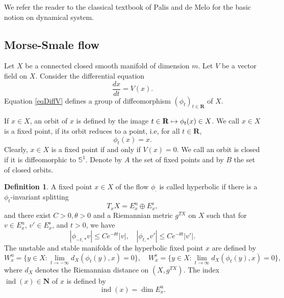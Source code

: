 \documentclass[JEP,XML,SOM,Unicode]{cedram}
\newcommand\mto{\mathchoice{\longmapsto}{\mapsto}{\mapsto}{\mapsto}}
\newcommand{\rs}{\mathrm{s}}
\newcommand{\ru}{\mathrm{u}}
\theoremstyle{plain}
\theoremstyle{definition}
\newtheorem{defin}[lem]{Definition}
\theoremstyle{remark}
\newcommand{\bN}{\mathbf{N}}
\newcommand{\bR}{\mathbf{R}}
\newcommand{\bbS}{\mathbb{S}}
\DeclareMathOperator{\ind}{ind}
\let\l\leqslant
\begin{document}
We refer the reader to the classical textbook of Palis and de
Melo \cite{Palis82} for the basic notion on dynamical system.

\subsection{Morse-Smale flow}\label{sMS}
Let $X$ be a connected closed smooth manifold of dimension $m$. Let $V$ be a
vector field on $X$. Consider the differential equation
\begin{equation}\label{eqDiffV}
\frac{dx}{dt}=V(x).
\end{equation}
Equation \eqref{eqDiffV} defines a group of diffeomorphism
$(\phi_{t})_{t\in \bR}$ of $X$.

If $x\in X$, an orbit of $x$ is defined by the image $t\in \bR\mto
\phi_{t}(x)\in X$. We call $x\in X$ is a fixed point, if its orbit reduces to a point, i.e, for all $t\in \bR$,
\begin{equation*}
\phi_{t}(x)=x.
\end{equation*}
Clearly, $x\in X$ is a fixed point if and only if $V(x)=0$.
We call an orbit is closed if it is diffeomorphic to $\bbS^{1}$.
Denote by $A$ the set of fixed points and by $B$ the set of closed orbits.

\begin{defin}
A fixed point $x\in X$ of the flow $\phi_{\cdot}$ is called
hyperbolic if there is a $\phi_{t}$-invariant splitting\vspace*{-3pt}
\begin{equation*}
T_{x}X= E^{\ru}_{x}\oplus E^{\rs}_{x},
\end{equation*}
and there exist $C>0,\theta>0$ and a Riemannian metric $g^{TX}$ on $X$
such that for $v\in E^{\ru}_{x}$, $v'\in E^{\rs}_{x}$, and $t>0$, we have\vspace*{-3pt}
\begin{equation*}\label{eqMS}
\left|\phi_{- t,*}v\right|\l
Ce^{-\theta t}\left|v\right|,\quad \left|\phi_{ t,*}v'\right|\l
Ce^{-\theta t}\left|v'\right|.
\end{equation*}
The unstable and stable manifolds of the hyperbolic fixed point $x$ are defined by
\begin{equation*}
W^{\ru}_{x}=\Big\{y\in X: \lim_{t\to -
\infty}d_{X}(\phi_{t}(y),x)=0\Big\},\quad W^{\rs}_{x}= \Big\{y\in X: \lim_{t\to
\infty}d_X(\phi_{t}(y),x)=0 \Big\},
\end{equation*}
where $d_{X}$ denotes the Riemannian distance on $(X,g^{TX})$. The index $\ind(x)\in \bN$ of $x$ is defined by\vspace*{-3pt}
\begin{equation}\label{eqindxEu}
\ind(x)=\dim E^{\ru}_{x}.
\end{equation}
\end{defin}
\end{document}
